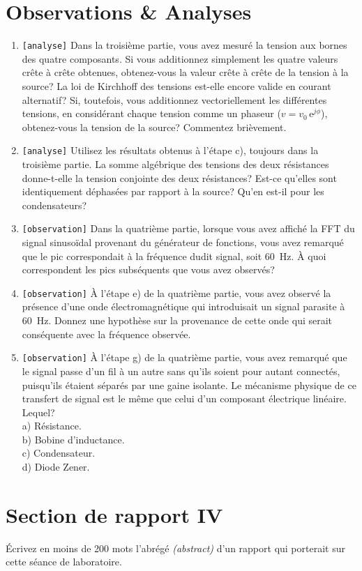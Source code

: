 \documentclass[canadien,12pt,oneside,letterpaper]{article}
\begin{document}
\section{Observations \& Analyses}

\begin{enumerate}
    \item \texttt{[analyse]} Dans la troisième partie, vous avez mesuré la tension aux bornes des quatre composants. Si vous additionnez simplement les quatre valeurs crête à crête obtenues, obtenez-vous la valeur crête à crête de la tension à la source? La loi de Kirchhoff des tensions est-elle encore valide en courant alternatif? Si, toutefois, vous additionnez vectoriellement les différentes tensions, en considérant chaque tension comme un phaseur ($v=v_0\,\textrm{e}^{j\phi}$), obtenez-vous la tension de la source? Commentez brièvement.
    \item \texttt{[analyse]} Utilisez les résultats obtenus à l'étape c), toujours dans la troisième partie. La somme algébrique des tensions des deux résistances donne-t-elle la tension conjointe des deux résistances? Est-ce qu'elles sont identiquement déphasées par rapport à la source? Qu'en est-il pour les condensateurs?
    \item \texttt{[observation]} Dans la quatrième partie, lorsque vous avez affiché la FFT du signal sinusoïdal provenant du générateur de fonctions, vous avez remarqué que le pic correspondait à la fréquence dudit signal, soit 60~Hz. À quoi correspondent les pics subséquents que vous avez observés?
    \item \texttt{[observation]} À l'étape e) de la quatrième partie, vous avez observé la présence d'une onde électromagnétique qui introduisait un signal parasite à 60~Hz. Donnez une hypothèse sur la provenance de cette onde qui serait conséquente avec la fréquence observée.
    \item \texttt{[observation]} À l'étape g) de la quatrième partie, vous avez remarqué que le signal passe d'un fil à un autre sans qu'ils soient pour autant connectés, puisqu'ils étaient séparés par une gaine isolante. Le mécanisme physique de ce transfert de signal est le même que celui d'un composant électrique linéaire. Lequel?\\a) Résistance.\\b) Bobine d'inductance.\\c) Condensateur.\\d) Diode Zener.
\end{enumerate}

\section{Section de rapport IV}

Écrivez en moins de 200 mots l'abrégé \textit{(abstract)} d'un rapport qui porterait sur cette séance de laboratoire.
\end{document}
